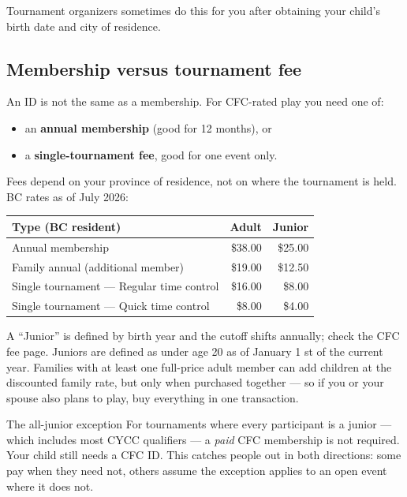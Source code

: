 \documentclass[10pt,letterpaper]{article}
\newcommand{\term}[1]{\textbf{#1}}
\begin{document}
Tournament organizers sometimes do this for you after obtaining your child’s birth date
and city of residence.

\subsection{Membership versus tournament fee}

An ID is not the same as a membership. For CFC-rated play you need one of:

\begin{itemize}
  \item an \term{annual membership} (good for 12 months), or
  \item a \term{single-tournament fee}, good for one event only.
\end{itemize}

Fees depend on your province of residence, not on where the tournament is held.
BC rates as of July 2026:

\begin{center}
\begin{tabular}{@{}lrr@{}}
\toprule
\textbf{Type (BC resident)} & \textbf{Adult} & \textbf{Junior} \\
\midrule
Annual membership & \$38.00 & \$25.00 \\
Family annual (additional member) & \$19.00 & \$12.50 \\
Single tournament --- Regular time control & \$16.00 & \$8.00 \\
Single tournament --- Quick time control & \$8.00 & \$4.00 \\
\bottomrule
\end{tabular}
\end{center}

A ``Junior'' is defined by birth year and the cutoff shifts annually; check the
CFC fee page. Juniors are defined as under age 20 as of January 1 st of the current year. Families with at least one full-price adult member can add
children at the discounted family rate, but only when purchased together --- so
if you or your spouse also plans to play, buy everything in one transaction.

\begin{keybox}{The all-junior exception}
For tournaments where every participant is a junior --- which includes most
CYCC qualifiers --- a \emph{paid} CFC membership is not required. Your child
still needs a CFC ID. This catches people out in both directions: some pay when
they need not, others assume the exception applies to an open event where it
does not.
\end{keybox}
\end{document}
